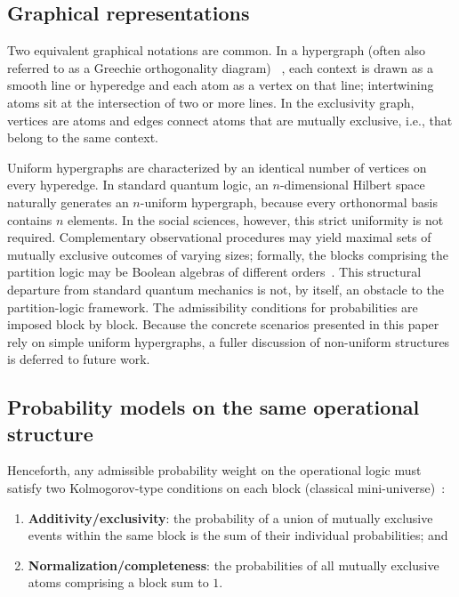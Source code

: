 \documentclass[aps,pra,twocolumn,superscriptaddress,floatfix,longbibliography]{revtex4-2}
\begin{document}
\subsection{Graphical representations}
\label{sec:prelim-gr}

Two equivalent graphical notations are common. In a hypergraph
(often also referred to as a Greechie orthogonality diagram)
~\cite{greechie:71,Bretto-MR3077516}, each context is drawn as a
smooth line or hyperedge and each atom as a vertex on that line;
intertwining atoms sit at the intersection of two or more lines. In
the exclusivity graph, vertices are atoms and edges connect atoms
that are mutually exclusive, i.e., that belong to the same context.

Uniform hypergraphs are characterized by an identical number of
vertices on every hyperedge. In standard quantum logic, an
$n$-dimensional Hilbert space naturally generates an $n$-uniform
hypergraph, because every orthonormal basis contains $n$ elements.
In the social sciences, however, this strict uniformity is not
required. Complementary observational procedures may yield maximal
sets of mutually exclusive outcomes of varying sizes; formally, the
blocks comprising the partition logic may be Boolean algebras of
different orders~\cite{greechie:71}. This structural departure from
standard quantum mechanics is not, by itself, an obstacle to the
partition-logic framework. The admissibility conditions for
probabilities are imposed block by block. Because the concrete
scenarios presented in this paper rely on simple uniform
hypergraphs, a fuller discussion of non-uniform structures is
deferred to future work.

\subsection{Probability models on the same operational structure}
\label{sec:twoprob}

Henceforth, any admissible probability weight on the operational
logic must satisfy two Kolmogorov-type conditions on each block
(classical mini-universe)~\cite{Gleason}:
\begin{enumerate}
\item \textbf{Additivity/exclusivity}: the probability of a union
of mutually exclusive events within the same block is the sum of
their individual probabilities; and
\item \textbf{Normalization/completeness}: the probabilities of all
mutually exclusive atoms comprising a block sum to $1$.
\end{enumerate}
\end{document}
